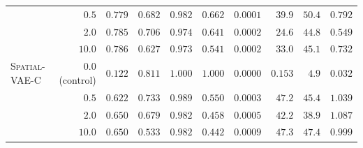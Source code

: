 \begin{table}[h]
\begin{tabular}{l r r r r r r r r r}
                       & $0.5$           & $0.779$ & $0.682$ & $0.982$ & $0.662$ & $0.0001$ & $39.9$   & $50.4$ & $0.792$ \\
                       & $2.0$           & $0.785$ & $0.706$ & $0.974$ & $0.641$ & $0.0002$ & $24.6$   & $44.8$ & $0.549$ \\
                       & $10.0$          & $0.786$ & $0.627$ & $0.973$ & $0.541$ & $0.0002$ & $33.0$   & $45.1$ & $0.732$ \\
\hline
\textsc{Spatial-VAE-C} & $0.0$ (control) & $0.122$ & $\mathbf{0.811}$ & $1.000$ & $1.000$ & $0.0000$ & $0.153$  & $4.9$  & $\mathbf{0.032}$ \\
                       & $0.5$           & $0.622$ & $0.733$ & $0.989$ & $0.550$ & $0.0003$ & $47.2$   & $45.4$ & $1.039$ \\
                       & $2.0$           & $0.650$ & $0.679$ & $0.982$ & $0.458$ & $0.0005$ & $42.2$   & $38.9$ & $1.087$ \\
                       & $10.0$          & $0.650$ & $0.533$ & $0.982$ & $0.442$ & $0.0009$ & $47.3$   & $47.4$ & $0.999$ \\
\hline
\end{tabular}
\end{table}

